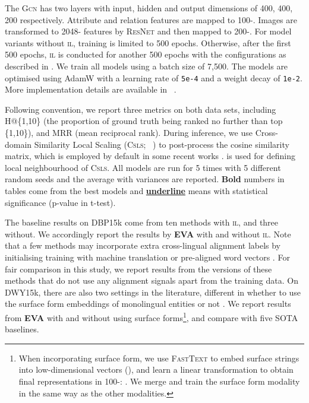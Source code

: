 \documentclass[letterpaper]{article} \usepackage{aaai21}  \usepackage{times}  \usepackage{helvet} \usepackage{courier}  \usepackage[hyphens]{url}  \usepackage{graphicx} \urlstyle{rm} \def\UrlFont{\rm}  \usepackage{natbib}  \usepackage{caption} \frenchspacing  \setlength{\pdfpagewidth}{8.5in}  \setlength{\pdfpageheight}{11in}
\newcommand{\modelname}[0]{\textbf{\textsc{EVA}}\xspace}
\newcommand{\stitle}[1]{\vspace{0.3ex} \noindent{\bf #1}}
\begin{document}
\stitle{Model configurations.} The \textsc{Gcn} has two layers with input, hidden and output dimensions of 400, 400, 200 respectively. Attribute and relation features are mapped to 100-. Images are transformed to 2048- features by \textsc{ResNet} and then mapped to 200-.
For model variants without \textsc{il}, training is limited to 500 epochs. 
Otherwise, after the first 500 epochs, \textsc{il} is conducted for another 500 epochs with the configurations  as described in . We train all models using a batch size of 7,500. 
The models are optimised using AdamW \citep{loshchilov2018decoupled} with a learning rate of \texttt{5e-4} and a weight decay of \texttt{1e-2}.
More implementation details are available in ~\cite{liu2021visual}.

\stitle{Evaluation protocols.} 
Following convention, we report three metrics on both data sets, including H@\{1,10\} (the proportion of ground truth being ranked no further than top \{1,10\}), and MRR (mean reciprocal rank). During inference, we use Cross-domain Similarity Local Scaling (\textsc{Csls}; \citeauthor{lample2018word}~\citeyear{lample2018word}) to post-process the cosine similarity matrix, which is employed by default in some recent works \citep{sun2019transedge,sun2020alinet}.  is used for defining local neighbourhood of \textsc{Csls}. All models are run for 5 times with 5 different random seeds and the average with variances are reported. \textbf{Bold} numbers in tables come from the best models and \underline{\textbf{underline}} means with statistical significance (p-value  in t-test).

The baseline results on DBP15k come from ten methods with \textsc{il}, and three without. We accordingly report the results by \modelname with and without \textsc{il}.
Note that a few methods may incorporate extra cross-lingual alignment labels by initialising training with machine translation \citep{wu2019jointly,yang2019aligning} or pre-aligned word vectors \citep{xu2019cross}. For fair comparison in this study, we report results from the versions of these methods that do not use any alignment signals apart from the training data. 
On DWY15k, there are also two settings in the literature, different in whether to use the surface form embeddings of monolingual entities \citep{yang2020cotsae} or not \citep{guo2019learning}. 
We report results from \modelname with and without using surface forms\footnote{When incorporating surface form, we use \textsc{FastText} \citep{bojanowski2017enriching} to embed surface strings into low-dimensional vectors  (), and learn a linear transformation to obtain final representations in 100-: . We merge and train the surface form modality in the same way as the other modalities.}, and compare with five SOTA baselines. 
\end{document}
